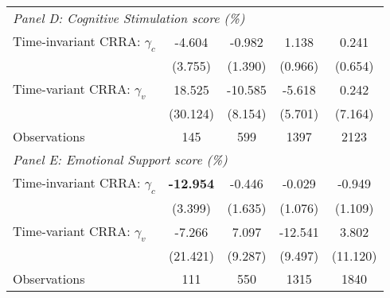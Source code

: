 {\begin{tabular}{l*{4}{c}}
\midrule
\multicolumn{5}{l}{\textit{Panel D: Cognitive Stimulation score (\%)}} \\
Time-invariant CRRA: $\gamma_c$&   -4.604         &   -0.982         &    1.138         &    0.241         \\
                &  (3.755)         &  (1.390)         &  (0.966)         &  (0.654)         \\
Time-variant CRRA: $\gamma_v$&   18.525         &  -10.585         &   -5.618         &    0.242         \\
                & (30.124)         &  (8.154)         &  (5.701)         &  (7.164)         \\
\midrule
Observations    &      145         &      599         &     1397         &     2123         \\




\midrule
\multicolumn{5}{l}{\textit{Panel E: Emotional Support score (\%)}} \\
Time-invariant CRRA: $\gamma_c$&  \textbf{-12.954\sym{***}}&   -0.446         &   -0.029         &   -0.949         \\
                &  (3.399)         &  (1.635)         &  (1.076)         &  (1.109)         \\

Time-variant CRRA: $\gamma_v$&   -7.266         &    7.097         &  -12.541         &    3.802         \\
                & (21.421)         &  (9.287)         &  (9.497)         & (11.120)         \\
\midrule
Observations    &      111         &      550         &     1315         &     1840         \\
\bottomrule
\end{tabular}
}
